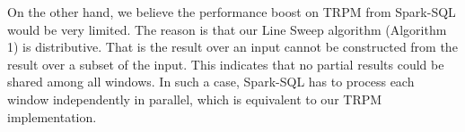 On the other hand, we believe the performance boost on TRPM from Spark-SQL
would be very limited. The reason is that our 
Line Sweep algorithm (Algorithm 1) is
distributive.
That is the result over an input cannot be constructed from
the result over a subset of the input. This indicates 
that no partial results could be shared among all windows.
In such a case, Spark-SQL has to process each
window independently in parallel, which is equivalent to our TRPM implementation.
%
%
%


